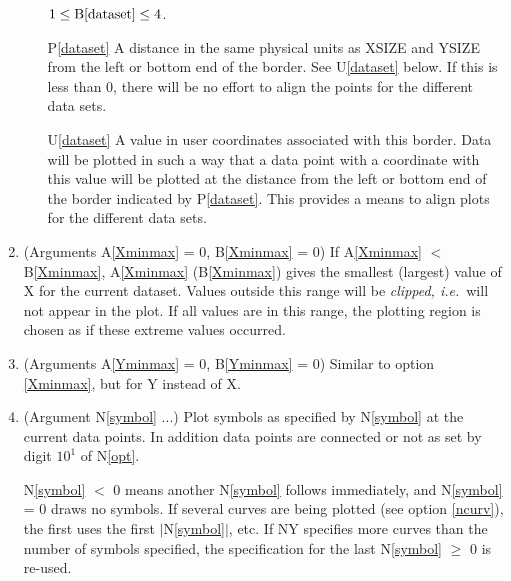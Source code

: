 \documentclass[twoside]{MATH77}
\begin{document}
\begin{multicols}{2}
\begin{enumerate}
\begin{itemize}
        $1 \leq \text{B\ref{dataset}} \leq 4$.
        \item[P\ref{dataset}] A distance in the same physical units as
        XSIZE and YSIZE from the left or bottom end of the border.  See
        U\ref{dataset} below.  If this is less than 0, there will be no
        effort to align the points for the different data sets.
        \item[U\ref{dataset}] A value in user coordinates associated
        with this border.  Data will be plotted in such a way that a data
        point with a coordinate with this value will be plotted at the
        distance from the left or bottom end of the border indicated by
        P\ref{dataset}.  This provides a means to align plots for the
        different data sets.
        \end{itemize}
\item\label{Xminmax} (Arguments A\ref{Xminmax} = 0, B\ref{Xminmax} = 0)
        If A\ref{Xminmax} $<$ B\ref{Xminmax}, A\ref{Xminmax}
        (B\ref{Xminmax}) gives the smallest (largest) value of X for the
        current dataset.  Values outside this range will be {\em clipped,
        i.e.}\ will not appear in the plot.  If all values are in this
        range, the plotting region is chosen as if these extreme values
        occurred.

\item\label{Yminmax} (Arguments A\ref{Yminmax} = 0, B\ref{Yminmax} = 0)
        Similar to option \ref{Xminmax}, but for Y instead of X.
\item\label{symbol}  (Argument N\ref{symbol} ...) Plot
        symbols as specified by N\ref{symbol} at the current data points.
        In addition data points are connected or not as set by digit
        $10^1$ of N\ref{opt}.

        N\ref{symbol} $<$ 0 means another N\ref{symbol} follows
        immediately, and N\ref{symbol} = 0 draws no symbols.
        If several curves are being plotted (see option \ref{ncurv}), the
        first uses the first $|$N\ref{symbol}$|$, etc.  If NY specifies
        more curves than the number of symbols specified, the
        specification for the last N\ref{symbol} $\geq$ 0 is re-used.


\end{enumerate}
\end{multicols}
\end{document}
